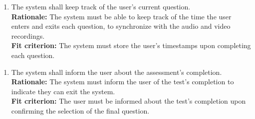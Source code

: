 \documentclass[12pt]{article}
\begin{document}
\begin{enumerate}[label={FR-AI}6. ]
  \item The system shall keep track of the user's current question.\\
  \textbf{Rationale: }The system must be able to keep track of the time the user enters and exits each question, to synchronize with the audio and video recordings.\\
  \textbf{Fit criterion: }The system must store the user's timestamps upon completing each question.
\end{enumerate}
\begin{enumerate}[label={FR-AI}7. ]
  \item The system shall inform the user about the assessment's completion.\\
  \textbf{Rationale: }The system must inform the user of the test's completion to indicate they can exit the system.\\
  \textbf{Fit criterion: }The user must be informed about the test's completion upon confirming the selection of the final question.
\end{enumerate}
\end{document}
